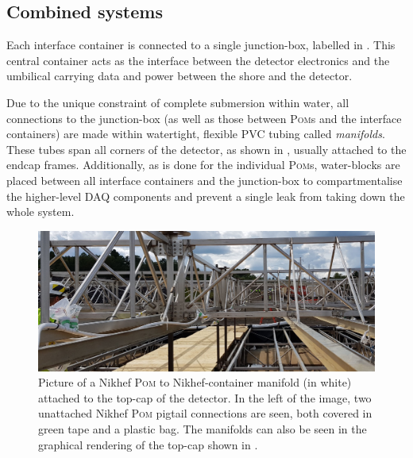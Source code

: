 \subsection{Combined systems} %
\label{sec:daq_hard_combined} %

Each interface container is connected to a single junction-box, labelled in
. This central container acts as the interface between the detector
electronics and the umbilical carrying data and power between the shore and the detector. 

Due to the unique \chips constraint of complete submersion within water, all connections to the
junction-box (as well as those between \textsc{Pom}s and the interface containers) are made within
watertight, flexible PVC tubing called \emph{manifolds}. These tubes span all corners of the
\chipsfive detector, as shown in , usually attached to the endcap frames.
Additionally, as is done for the individual \textsc{Pom}s, water-blocks are placed between all
interface containers and the junction-box to compartmentalise the higher-level DAQ components and
prevent a single leak from taking down the whole system.

\begin{figure} %
    \includegraphics[width=\textwidth]{diagrams/5-daq/manifold.pdf}
    \caption[Picture of a manifold connection within the \chipsfive detector]
    {Picture of a Nikhef \textsc{Pom} to Nikhef-container manifold (in white) attached to the
        top-cap of the \chipsfive detector. In the left of the image, two unattached Nikhef
        \textsc{Pom} pigtail connections are seen, both covered in green tape and a plastic bag.
        The manifolds can also be seen in the graphical rendering of the top-cap shown in
        .}
    \label{fig:manifold}
\end{figure}

